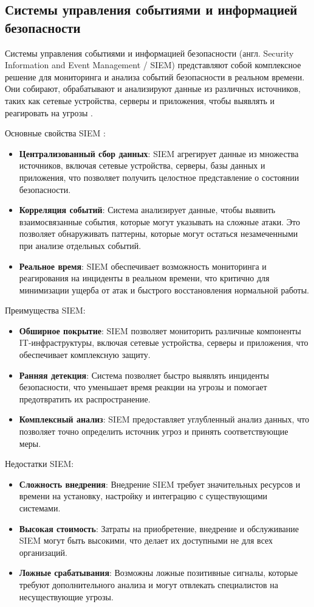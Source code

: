 \subsection{Системы управления событиями и информацией безопасности}

Системы управления событиями и информацией безопасности (англ. Security Information and Event Management / SIEM) представляют собой комплексное решение для мониторинга и анализа событий безопасности в реальном времени. Они собирают, обрабатывают и анализируют данные из различных источников, таких как сетевые устройства, серверы и приложения, чтобы выявлять и реагировать на угрозы \cite{SIEMSec}.

Основные свойства SIEM \cite{IBMSIEM}:
\begin{itemize}
    \item \textbf{Централизованный сбор данных}: SIEM агрегирует данные из множества источников, включая сетевые устройства, серверы, базы данных и приложения, что позволяет получить целостное представление о состоянии безопасности.
    \item \textbf{Корреляция событий}: Система анализирует данные, чтобы выявить взаимосвязанные события, которые могут указывать на сложные атаки. Это позволяет обнаруживать паттерны, которые могут остаться незамеченными при анализе отдельных событий.
    \item \textbf{Реальное время}: SIEM обеспечивает возможность мониторинга и реагирования на инциденты в реальном времени, что критично для минимизации ущерба от атак и быстрого восстановления нормальной работы.
\end{itemize}

Преимущества SIEM:
\begin{itemize}
    \item \textbf{Обширное покрытие}: SIEM позволяет мониторить различные компоненты IT-инфраструктуры, включая сетевые устройства, серверы и приложения, что обеспечивает комплексную защиту.
    \item \textbf{Ранняя детекция}: Система позволяет быстро выявлять инциденты безопасности, что уменьшает время реакции на угрозы и помогает предотвратить их распространение.
    \item \textbf{Комплексный анализ}: SIEM предоставляет углубленный анализ данных, что позволяет точно определить источник угроз и принять соответствующие меры.
\end{itemize}

Недостатки SIEM:
\begin{itemize}
    \item \textbf{Сложность внедрения}: Внедрение SIEM требует значительных ресурсов и времени на установку, настройку и интеграцию с существующими системами.
    \item \textbf{Высокая стоимость}: Затраты на приобретение, внедрение и обслуживание SIEM могут быть высокими, что делает их доступными не для всех организаций.
    \item \textbf{Ложные срабатывания}: Возможны ложные позитивные сигналы, которые требуют дополнительного анализа и могут отвлекать специалистов на несуществующие угрозы.
\end{itemize}


